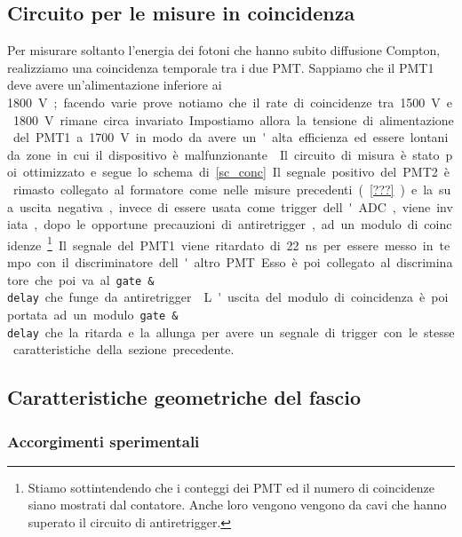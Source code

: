 \subsection{Circuito per le misure in coincidenza}

Per misurare soltanto l'energia dei fotoni che hanno subito diffusione Compton, realizziamo una coincidenza temporale tra i due PMT. Sappiamo che il PMT1 deve avere un'alimentazione inferiore ai \SI{1800}V; facendo varie prove notiamo che il rate di coincidenze tra \SI{1500}V e \SI{1800}V rimane circa invariato. Impostiamo allora la tensione di alimentazione del PMT1 a \SI{1700}V in modo da avere un'alta efficienza ed essere lontani da zone in cui il dispositivo è malfunzionante.

Il circuito di misura è stato poi ottimizzato e segue lo schema di \autoref{sc_conc}. Il segnale positivo del PMT2 è rimasto collegato al formatore come nelle misure precedenti (\autoref{???}) e la sua uscita negativa, invece di essere usata come trigger dell'ADC, viene inviata, dopo le opportune precauzioni di antiretrigger, ad un modulo di coincidenze%
\footnote{Stiamo sottintendendo che i conteggi dei PMT ed il numero di coincidenze siano mostrati dal contatore. Anche loro vengono vengono da cavi che hanno superato il circuito di antiretrigger.}.

Il segnale del PMT1  viene ritardato di \SI{22}{ns} per essere messo in tempo con il discriminatore dell'altro PMT. Esso è poi collegato al discriminatore che poi va al \texttt{gate \& delay} che funge da antiretrigger.

L'uscita del modulo di coincidenza è poi portata ad un modulo \texttt{gate \& delay} che la ritarda e la allunga per avere un segnale di trigger con le stesse caratteristiche della sezione precedente.

\subsection{Caratteristiche geometriche del fascio}

\subsubsection{Accorgimenti sperimentali}

